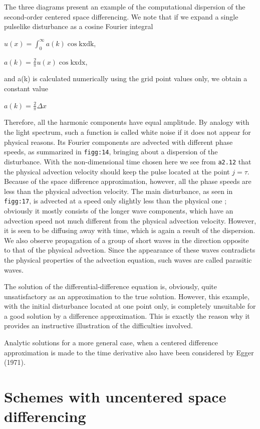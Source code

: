 The three diagrams present an example of the computational dispersion
of the second-order centered space differencing. We note that if we
expand a single pulselike disturbance as a cosine Fourier integral

\(u\left( x \right) = \int_{0}^{\infty}{a\left( k \right)\cos\text{kxdk}}\),

\(a\left( k \right) = \frac{2}{\pi}u\left( x \right)\cos\text{kxdx}\),

and a(k) is calculated numerically using the grid point values only, we
obtain a constant value

\(a\left( k \right) = \frac{2}{\pi}\Delta x\)

Therefore, all the harmonic components have equal amplitude. By analogy
with the light spectrum, such a function is called white noise if it
does not appear for physical reasons. Its Fourier components are
advected with different phase speeds, as summarized in \texttt{figg:14},
bringing about a dispersion of the disturbance. With the non-dimensional
time chosen here we see from \texttt{a2.12} that the physical advection
velocity should keep the pulse located at the point \(j = \tau.\)
Because of the space difference approximation, however, all the phase
speeds are less than the physical advection velocity. The main
disturbance, as seen in \texttt{figg:17}, is advected at a speed only
slightly less than the physical one ; obviously it mostly consists of
the longer wave components, which have an advection speed not much
different from the physical advection velocity. However, it is seen to
be diffusing away with time, which is again a result of the dispersion.
We also observe propagation of a group of short waves in the direction
opposite to that of the physical advection. Since the appearance of
these waves contradicts the physical properties of the advection
equation, such waves are called parasitic waves.

The solution of the differential-difference equation is, obviously,
quite unsatisfactory as an approximation to the true solution. However,
this example, with the initial disturbance located at one point only, is
completely unsuitable for a good solution by a difference
approximation. This is exactly the reason why it provides an
instructive illustration of the difficulties involved.

Analytic solutions for a more general case, when a centered difference
approximation is made to the time derivative also have been considered
by Egger (1971).

\section{Schemes with uncentered space differencing}\label{sec:schemes-with-uncentered-space-differencing}

